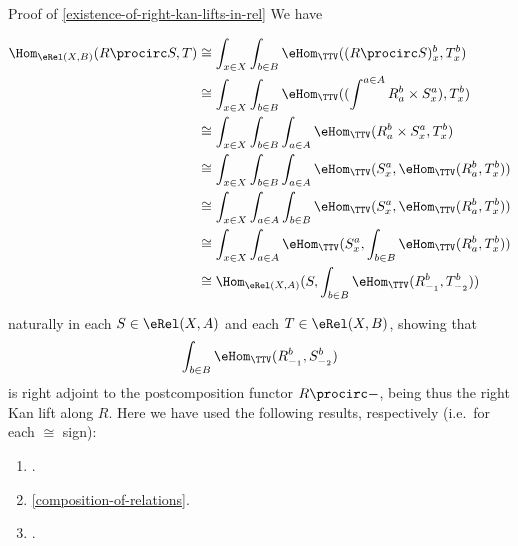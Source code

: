 \begin{Proof}{Proof of \cref{existence-of-right-kan-lifts-in-rel}}%
    We have
    \begin{envsmallsize}
        \begin{align*}
            \Hom_{\eRel(X,B)}(R\procirc S,T) &\cong  \int_{x\in X}\int_{b\in B}\eHom_{\TTV}((R\procirc S)^{b}_{x},T^{b}_{x})\\
                                             &\cong  \int_{x\in X}\int_{b\in B}\eHom_{\TTV}((\int^{a\in A}R^{b}_{a}\times S^{a}_{x}),T^{b}_{x})\\
                                             &\cong  \int_{x\in X}\int_{b\in B}\int_{a\in A}\eHom_{\TTV}(R^{b}_{a}\times S^{a}_{x},T^{b}_{x})\\
                                             &\cong  \int_{x\in X}\int_{b\in B}\int_{a\in A}\eHom_{\TTV}(S^{a}_{x},\eHom_{\TTV}(R^{b}_{a},T^{b}_{x}))\\
                                             &\cong  \int_{x\in X}\int_{a\in A}\int_{b\in B}\eHom_{\TTV}(S^{a}_{x},\eHom_{\TTV}(R^{b}_{a},T^{b}_{x}))\\
                                             &\cong  \int_{x\in X}\int_{a\in A}\eHom_{\TTV}(S^{a}_{x},\int_{b\in B}\eHom_{\TTV}(R^{b}_{a},T^{b}_{x}))\\
                                             &\cong  \Hom_{\eRel(X,A)}(S,\int_{b\in B}\eHom_{\TTV}(R^{b}_{-_{1}},T^{b}_{-_{2}}))%
        \end{align*}
    \end{envsmallsize}
    naturally in each $S\in\eRel(X,A)$ and each $T\in\eRel(X,B)$, showing that
    \[
        \int_{b\in B}\eHom_{\TTV}(R^{b}_{-_{1}},S^{b}_{-_{2}})%
    \]%
    is right adjoint to the postcomposition functor $R\procirc-$, being thus the right Kan lift along $R$. Here we have used the following results, respectively (i.e.\ for each $\cong$ sign):
    \begin{enumerate}
        \item\label{proof-of-existence-of-right-kan-lifts-in-rel-1}.
        \item\label{proof-of-existence-of-right-kan-lifts-in-rel-2}\cref{composition-of-relations}.
        \item\label{proof-of-existence-of-right-kan-lifts-in-rel-3}.

\end{enumerate}
\end{Proof}
